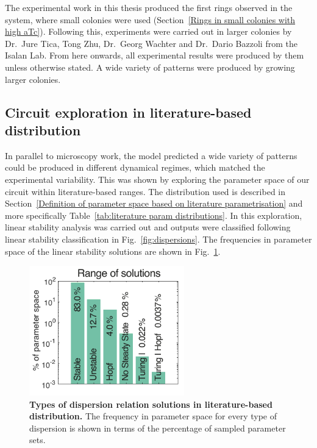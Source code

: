 The experimental work in this thesis produced the first rings observed in the system, where small colonies were used (Section~\ref{Rings in small colonies with high aTc}).
Following this, experiments were carried out in larger colonies by Dr.~Jure Tica, Tong Zhu, Dr.~Georg Wachter and Dr.~Dario Bazzoli from the Isalan Lab.
From here onwards, all experimental results were produced by them unless otherwise stated.
A wide variety of patterns were produced by growing larger colonies.


\subsection{Circuit exploration in literature-based distribution}
In parallel to microscopy work, the model predicted a wide variety of patterns could be produced in different dynamical regimes, which matched the experimental variability.
This was shown by exploring the parameter space of our circuit within literature-based ranges.
The distribution used is described in Section~\ref{Definition of parameter space based on literature parametrisation} and more specifically Table~\ref{tab:literature param distributions}.
In this exploration, linear stability analysis was carried out and outputs were classified following linear stability classification in Fig.~\ref{fig:dispersions}.
The frequencies in parameter space of the linear stability solutions are shown in Fig.~\ref{system_class_frequencies}.
\begin{figure}[H]
    \centering

    \includegraphics[width=0.6\textwidth]{chapters/Chapter 3/system_class_frequencies}
    \caption{\textbf{Types of dispersion relation solutions in literature-based distribution.} The frequency in parameter space for every type of dispersion is shown in terms of the percentage of sampled parameter sets.}
    \label{system_class_frequencies}
\end{figure}

